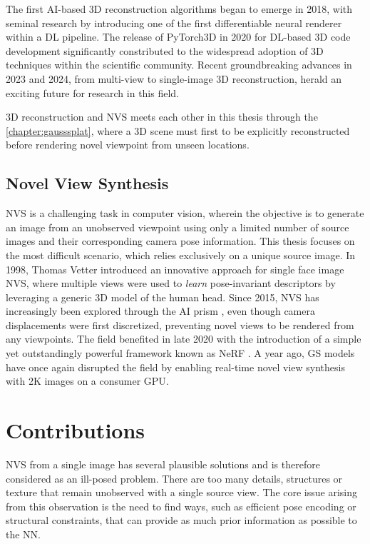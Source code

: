 The first \ac{AI}-based 3D reconstruction algorithms began to emerge in 2018, with seminal research by \citep{kato2018neural} introducing one of the first differentiable neural renderer within a \ac{DL} pipeline. The release of PyTorch3D \citep{ravi2020pytorch3d} in 2020 for \ac{DL}-based 3D code development significantly constributed to the widespread adoption of 3D techniques within the scientific community. Recent groundbreaking advances in 2023 and 2024, from multi-view \citep{li2023neuralangelo} to single-image \citep{voleti2024sv3d} 3D reconstruction, herald an exciting future for research in this field.

3D reconstruction and \ac{NVS} meets each other in this thesis through the \autoref{chapter:gausssplat}, where a 3D scene must first to be explicitly reconstructed before  rendering novel viewpoint from unseen locations. 

\subsection{Novel View Synthesis}
\ac{NVS} is a challenging task in computer vision, wherein the objective is to generate an image from an unobserved viewpoint using only a limited number of source images and their corresponding camera pose information. This thesis focuses on the most difficult scenario, which relies exclusively on a unique source image. In 1998, Thomas Vetter introduced an innovative approach \cite{vetter1998synthesis} for single face image \ac{NVS}, where multiple views were used to \textit{learn} pose-invariant descriptors by leveraging a generic 3D model of the human head. Since 2015, \ac{NVS} has increasingly been explored through the \ac{AI} prism \citep{yang2015weakly}, even though camera displacements were first discretized, preventing novel views to be rendered from any viewpoints. The field benefited in late 2020 with the introduction of a simple yet outstandingly powerful framework known as \ac{NeRF} \cite{mildenhall2020nerf}. A year ago, \ac{GS} models have once again disrupted the field by enabling real-time novel view synthesis with 2K  images on a consumer \ac{GPU}. 


\section{Contributions}
\ac{NVS} from a single image has several plausible solutions and is therefore considered as an ill-posed problem. There are too many details, structures or texture that remain unobserved with a single source view. The core issue arising from this observation is the need to find ways, such as efficient pose encoding or structural constraints, that can provide as much prior information as possible to the \ac{NN}. 

